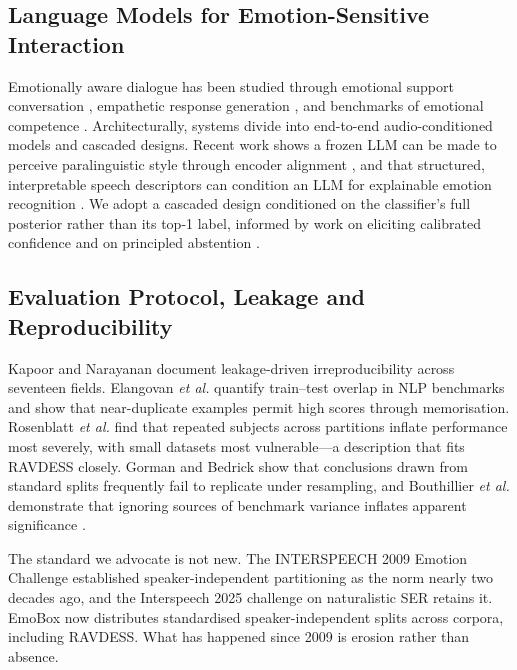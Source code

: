 \documentclass[journal,onecolumn,11pt,draftclsnofoot]{IEEEtran}   %
\begin{document}
\subsection{Language Models for Emotion-Sensitive Interaction}
Emotionally aware dialogue has been studied through emotional support
conversation \cite{liu2021esconv}, empathetic response generation
\cite{qian2023empathetic}, and benchmarks of emotional competence
\cite{sabour2024emobench}. Architecturally, systems divide into end-to-end
audio-conditioned models \cite{tang2023salmonn,chu2024qwen2audio,
kim2024paralinguistics} and cascaded designs. Recent work shows a frozen LLM can
be made to perceive paralinguistic style through encoder alignment
\cite{kang2025frozen}, and that structured, interpretable speech descriptors can
condition an LLM for explainable emotion recognition \cite{chen2025descriptors}.
We adopt a cascaded design conditioned on the classifier's full posterior rather
than its top-1 label, informed by work on eliciting calibrated confidence
\cite{tian2023calibration} and on principled abstention \cite{wen2025abstention}.

\subsection{Evaluation Protocol, Leakage and Reproducibility}
\label{sec:rw-leakage}
Kapoor and Narayanan \cite{kapoor2023leakage} document leakage-driven
irreproducibility across seventeen fields. Elangovan \emph{et al.}
\cite{elangovan2021memorization} quantify train--test overlap in NLP benchmarks
and show that near-duplicate examples permit high scores through memorisation.
Rosenblatt \emph{et al.} \cite{rosenblatt2024leakage} find that repeated
subjects across partitions inflate performance most severely, with small
datasets most vulnerable---a description that fits RAVDESS closely. Gorman and
Bedrick \cite{gorman2019splits} show that conclusions drawn from standard splits
frequently fail to replicate under resampling, and Bouthillier \emph{et al.}
\cite{bouthillier2021variance} demonstrate that ignoring sources of benchmark
variance inflates apparent significance \cite{niessl2022overoptimism,
lones2024pitfalls}.

The standard we advocate is not new. The INTERSPEECH 2009 Emotion Challenge
\cite{schuller2009challenge} established speaker-independent partitioning as the
norm nearly two decades ago, and the Interspeech 2025 challenge on naturalistic
SER \cite{naini2025challenge} retains it. EmoBox \cite{ma2024emobox} now
distributes standardised speaker-independent splits across corpora, including
RAVDESS. What has happened since 2009 is erosion rather than absence.
\end{document}
